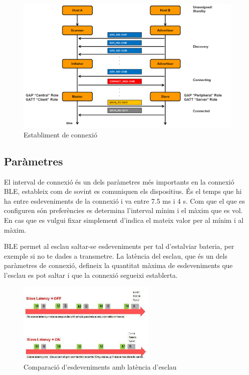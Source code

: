 \begin{figure}[h]
	\begin{center}
		\includegraphics[width=1\textwidth]{./images/rols_unicast.png}
		\caption{Establiment de connexió}
	\end{center}
\end{figure}

\subsection{Paràmetres}
El interval de connexió és un dels paràmetres més importants en la connexió BLE, estableix com de sovint es comuniquen els dispositius.
És el temps que hi ha entre esdeveniments de la connexió i va entre 7.5 ms i 4 s.
Com que el que es configuren són preferències es determina l'interval mínim i el màxim que es vol.
En cas que es vulgui fixar simplement d'indica el mateix valor per al mínim i al màxim.

BLE permet al esclau saltar-se esdeveniments per tal d'estalviar bateria, per exemple si no te dades a transmetre.
La latència del esclau, que és un dels paràmetres de connexió, defineix la quantitat màxima de esdeveniments que l'esclau es pot saltar i que la connexió segueixi establerta.

\begin{figure}[!h]
	\begin{center}
		\includegraphics[width=0.6\textwidth]{./images/slave_latency.jpeg}
		\caption{Comparació d'esdeveniments amb latència d'esclau}
	\end{center}
\end{figure}

